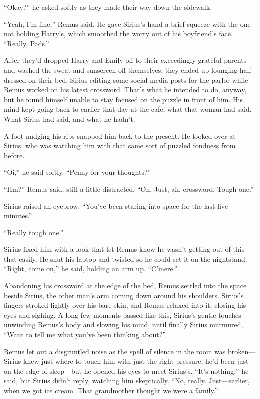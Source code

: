 “Okay?” he asked softly as they made their way down the sidewalk.

“Yeah, I’m fine,” Remus said. He gave Sirius’s hand a brief squeeze with the one not holding Harry’s, which smoothed the worry out of his boyfriend’s face. “Really, Pads.”

After they’d dropped Harry and Emily off to their exceedingly grateful parents and washed the sweat and sunscreen off themselves, they ended up lounging half-dressed on their bed, Sirius editing some social media posts for the parlor while Remus worked on his latest crossword. That’s what he intended to do, anyway, but he found himself unable to stay focused on the puzzle in front of him. His mind kept going back to earlier that day at the cafe, what that woman had said. What Sirius had said, and what he hadn’t.

A foot nudging his ribs snapped him back to the present. He looked over at Sirius, who was watching him with that same sort of puzzled fondness from before.

“Oi,” he said softly. “Penny for your thoughts?”

“Hm?” Remus said, still a little distracted. “Oh. Just, ah, crossword. Tough one.”

Sirius raised an eyebrow. “You’ve been staring into space for the last five minutes.”

“Really tough one.”

Sirius fixed him with a look that let Remus know he wasn’t getting out of this that easily. He shut his laptop and twisted so he could set it on the nightstand. “Right, come on,” he said, holding an arm up. “C’mere.”

Abandoning his crossword at the edge of the bed, Remus settled into the space beside Sirius, the other man’s arm coming down around his shoulders. Sirius’s fingers stroked lightly over his bare skin, and Remus relaxed into it, closing his eyes and sighing. A long few moments passed like this, Sirius’s gentle touches unwinding Remus’s body and slowing his mind, until finally Sirius murmured, “Want to tell me what you’ve been thinking about?”

Remus let out a disgruntled noise as the spell of silence in the room was broken—Sirius knew just where to touch him with just the right pressure, he’d been just on the edge of sleep—but he opened his eyes to meet Sirius’s. “It’s nothing,” he said, but Sirius didn’t reply, watching him skeptically. “No, really. Just—earlier, when we got ice cream. That grandmother thought we were a family.”

